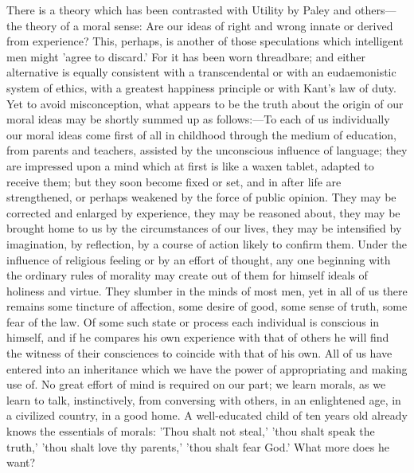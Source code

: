 \documentclass[11pt,letter]{article}
\begin{document}
\par  There is a theory which has been contrasted with Utility by Paley and others—the theory of a moral sense: Are our ideas of right and wrong innate or derived from experience? This, perhaps, is another of those speculations which intelligent men might 'agree to discard.' For it has been worn threadbare; and either alternative is equally consistent with a transcendental or with an eudaemonistic system of ethics, with a greatest happiness principle or with Kant's law of duty. Yet to avoid misconception, what appears to be the truth about the origin of our moral ideas may be shortly summed up as follows:—To each of us individually our moral ideas come first of all in childhood through the medium of education, from parents and teachers, assisted by the unconscious influence of language; they are impressed upon a mind which at first is like a waxen tablet, adapted to receive them; but they soon become fixed or set, and in after life are strengthened, or perhaps weakened by the force of public opinion. They may be corrected and enlarged by experience, they may be reasoned about, they may be brought home to us by the circumstances of our lives, they may be intensified by imagination, by reflection, by a course of action likely to confirm them. Under the influence of religious feeling or by an effort of thought, any one beginning with the ordinary rules of morality may create out of them for himself ideals of holiness and virtue. They slumber in the minds of most men, yet in all of us there remains some tincture of affection, some desire of good, some sense of truth, some fear of the law. Of some such state or process each individual is conscious in himself, and if he compares his own experience with that of others he will find the witness of their consciences to coincide with that of his own. All of us have entered into an inheritance which we have the power of appropriating and making use of. No great effort of mind is required on our part; we learn morals, as we learn to talk, instinctively, from conversing with others, in an enlightened age, in a civilized country, in a good home. A well-educated child of ten years old already knows the essentials of morals: 'Thou shalt not steal,' 'thou shalt speak the truth,' 'thou shalt love thy parents,' 'thou shalt fear God.' What more does he want?
\end{document}
